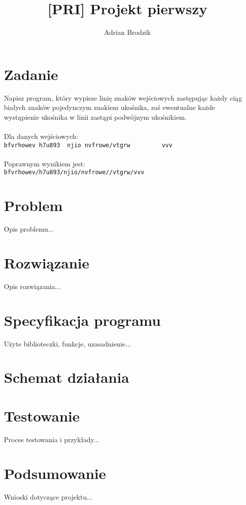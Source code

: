\documentclass[a4paper, 12pt]{article}
\title{\bf [PRI] Projekt pierwszy}
\author{Adrian Brodzik}
\begin{document}
\maketitle

\section*{Zadanie}
Napisz program, który wypisze linię znaków wejściowych zastępując każdy ciąg białych znaków pojedynczym znakiem ukośnika, zaś ewentualne każde wystąpienie ukośnika w linii zastąpi podwójnym ukośnikiem.
\\
\\
Dla danych wejściowych:\\
\lstinline{bfvrhowev h7u893  njio nvfrowe/vtgrw         vvv}
\\
\\
Poprawnym wynikiem jest:\\
\lstinline{bfvrhowev/h7u893/njio/nvfrowe//vtgrw/vvv}

\section*{Problem}
Opis problemu...

\section*{Rozwiązanie}
Opis rozwiązania...

\section*{Specyfikacja programu}
Użyte biblioteczki, funkcje, uzasadnienie...

\section*{Schemat działania}
\begin{center}
\end{center}

\section*{Testowanie}
Proces testowania i przykłady...

\section*{Podsumowanie}
Wnioski dotyczące projektu...
\end{document}
